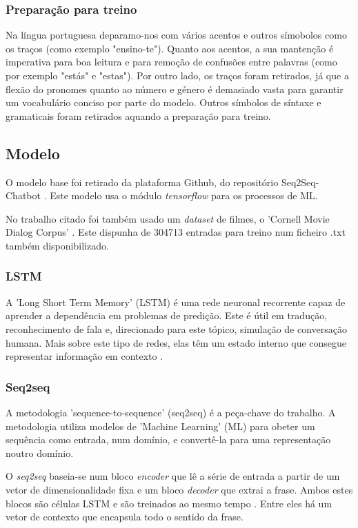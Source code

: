\documentclass{article}
\begin{document}
\subsubsection{Preparação para treino}
Na língua portuguesa deparamo-nos com vários acentos e outros símobolos como os traços (como exemplo "ensino-te"). Quanto aos acentos, a sua mantenção é imperativa para boa leitura e para remoção de confusões entre palavras (como por exemplo "estás" e "estas"). Por outro lado, os traços foram retirados, já que a flexão do pronomes quanto ao número e género é demasiado vasta para garantir um vocabulário conciso por parte do modelo. Outros símbolos de síntaxe e gramaticais foram retirados aquando a preparação para treino.


\subsection{Modelo}
O modelo base foi retirado da plataforma Github, do repositório Seq2Seq-Chatbot \cite{abonia2020seq2seq}. Este modelo usa o módulo \textit{tensorflow} para os processos de ML.

No trabalho citado foi também usado um \textit{dataset} de filmes, o 'Cornell Movie Dialog Corpus' \cite{cornell}. Este dispunha de 304713 entradas para treino num ficheiro .txt também disponibilizado.

\subsubsection{LSTM}
A 'Long Short Term Memory' (LSTM) é uma rede neuronal recorrente capaz de aprender a dependência em problemas de predição. Este é útil em tradução, reconhecimento de fala e, direcionado para este tópico, simulação de conversação humana. Mais sobre este tipo de redes, elas têm um estado interno que consegue representar informação em contexto \cite{bengio1994learning}.

\subsubsection{Seq2seq}
A metodologia 'sequence-to-sequence' (seq2seq) é a peça-chave do trabalho. A metodologia utiliza modelos de 'Machine Learning' (ML) para obeter um sequência como entrada, num domínio, e convertê-la para uma representação noutro domínio. 

O \textit{seq2seq} baseia-se num bloco \textit{encoder} que lê a série de entrada a partir de um vetor de dimensionalidade fixa e um bloco \textit{decoder} que extrai a frase. Ambos estes blocos são células LSTM e são treinados ao mesmo tempo \cite{sutskever2014sequence}. Entre eles há um vetor de contexto que encapsula todo o sentido da frase.
\end{document}
